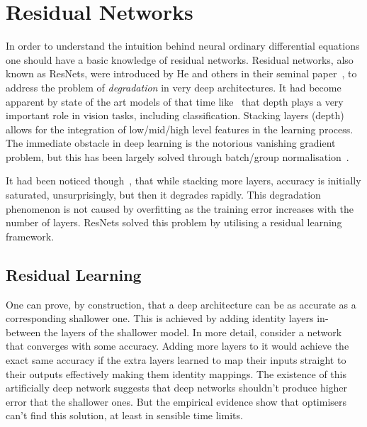 \documentclass[11pt]{article}
\begin{document}
    \section{Residual Networks}
    In order to understand the intuition behind neural ordinary differential equations one should have a basic knowledge
    of residual networks.
    Residual networks, also known as ResNets, were introduced by He and others in their seminal
    paper~\cite{He_2016_CVPR}, to address the problem of \textit{degradation} in very deep architectures.
    It had become apparent by state of the art models of that time like~\cite{simonyan2014very} that depth plays a very
    important role in vision tasks, including classification.
    Stacking layers (depth) allows for the integration of low/mid/high level features in the learning process.
    The immediate obstacle in deep learning is the notorious vanishing gradient problem, but this has been largely
    solved through batch/group normalisation~\cite{ioffe2015batch}.

    It had been noticed though~\cite{srivastava2015highway}, that while stacking more layers, accuracy is initially saturated, unsurprisingly, but then it degrades rapidly.
    This degradation phenomenon is not caused by overfitting as the training error increases with the number of layers.
    ResNets solved this problem by utilising a residual learning framework.

    \subsection{Residual Learning}
    One can prove, by construction, that a deep architecture can be as accurate as a corresponding shallower one.
    This is achieved by adding identity layers in-between the layers of the shallower model.
    In more detail, consider a network that converges with some accuracy.
    Adding more layers to it would achieve the exact same accuracy if the extra layers learned to map their inputs straight to their outputs effectively making them identity mappings.
    The existence of this artificially deep network suggests that deep networks shouldn't produce higher error that the shallower ones.
    But the empirical evidence show that optimisers can't find this solution, at least in sensible time limits.
\end{document}
